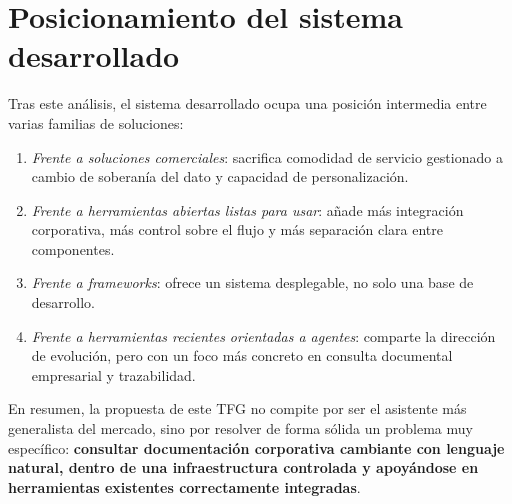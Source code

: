 \section{Posicionamiento del sistema desarrollado}
\label{sec:posicionamiento}

Tras este análisis, el sistema desarrollado ocupa una posición intermedia entre varias familias de soluciones:

\begin{enumerate}
    \item \textit{Frente a soluciones comerciales}: sacrifica comodidad de servicio gestionado a cambio de soberanía del dato y capacidad de personalización.
    \item \textit{Frente a herramientas abiertas listas para usar}: añade más integración corporativa, más control sobre el flujo y más separación clara entre componentes.
    \item \textit{Frente a frameworks}: ofrece un sistema desplegable, no solo una base de desarrollo.
    \item \textit{Frente a herramientas recientes orientadas a agentes}: comparte la dirección de evolución, pero con un foco más concreto en consulta documental empresarial y trazabilidad.
\end{enumerate}

En resumen, la propuesta de este TFG no compite por ser el asistente más generalista del mercado, sino por resolver de forma sólida un problema muy específico: \textbf{consultar documentación corporativa cambiante con lenguaje natural, dentro de una infraestructura controlada y apoyándose en herramientas existentes correctamente integradas}.
